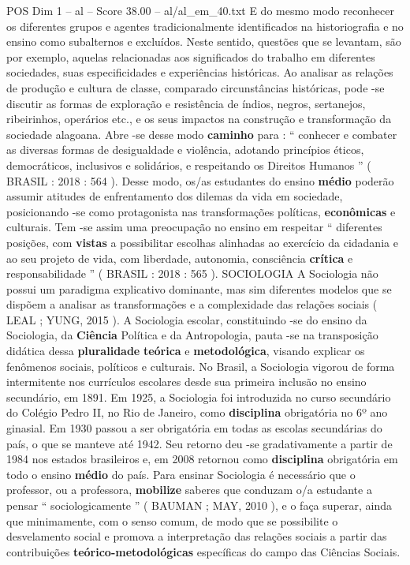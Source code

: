 \begin{textsample}{POS Dim 1 – al – Score 38.00 – al/al\_em\_40.txt}
E do mesmo modo reconhecer os diferentes grupos e agentes tradicionalmente identificados na historiografia e no ensino como subalternos e excluídos.
Neste sentido, questões que se levantam, são por exemplo, aquelas relacionadas aos significados do trabalho em diferentes sociedades, suas especificidades e experiências históricas.
Ao analisar as relações de produção e cultura de classe, comparado circunstâncias históricas, pode -se discutir as formas de exploração e resistência de índios, negros, sertanejos, ribeirinhos, operários etc., e os seus impactos na construção e transformação da sociedade alagoana.
Abre -se desse modo \textbf{caminho} para : “ conhecer e combater as diversas formas de desigualdade e violência, adotando princípios éticos, democráticos, inclusivos e solidários, e respeitando os Direitos Humanos ” ( BRASIL : 2018 : 564 ).
Desse modo, os/as estudantes do ensino \textbf{médio} poderão assumir atitudes de enfrentamento dos dilemas da vida em sociedade, posicionando -se como protagonista nas transformações políticas, \textbf{econômicas} e culturais.
Tem -se assim uma preocupação no ensino em respeitar “ diferentes posições, com \textbf{vistas} a possibilitar escolhas alinhadas ao exercício da cidadania e ao seu projeto de vida, com liberdade, autonomia, consciência \textbf{crítica} e responsabilidade ” ( BRASIL : 2018 : 565 ).
SOCIOLOGIA A Sociologia não possui um paradigma explicativo dominante, mas sim diferentes modelos que se dispõem a analisar as transformações e a complexidade das relações sociais ( LEAL ; YUNG, 2015 ).
A Sociologia escolar, constituindo -se do ensino da Sociologia, da \textbf{Ciência} Política e da Antropologia, pauta -se na transposição didática dessa \textbf{pluralidade} \textbf{teórica} e \textbf{metodológica}, visando explicar os fenômenos sociais, políticos e culturais.
No Brasil, a Sociologia vigorou de forma intermitente nos currículos escolares desde sua primeira inclusão no ensino secundário, em 1891.
Em 1925, a Sociologia foi introduzida no curso secundário do Colégio Pedro II, no Rio de Janeiro, como \textbf{disciplina} obrigatória no 6º ano ginasial.
Em 1930 passou a ser obrigatória em todas as escolas secundárias do país, o que se manteve até 1942.
Seu retorno deu -se gradativamente a partir de 1984 nos estados brasileiros e, em 2008 retornou como \textbf{disciplina} obrigatória em todo o ensino \textbf{médio} do país.
Para ensinar Sociologia é necessário que o professor, ou a professora, \textbf{mobilize} saberes que conduzam o/a estudante a pensar “ sociologicamente ” ( BAUMAN ; MAY, 2010 ), e o faça superar, ainda que minimamente, com o senso comum, de modo que se possibilite o desvelamento social e promova a interpretação das relações sociais a partir das contribuições \textbf{teórico-metodológicas} específicas do campo das Ciências Sociais.

\end{textsample}
